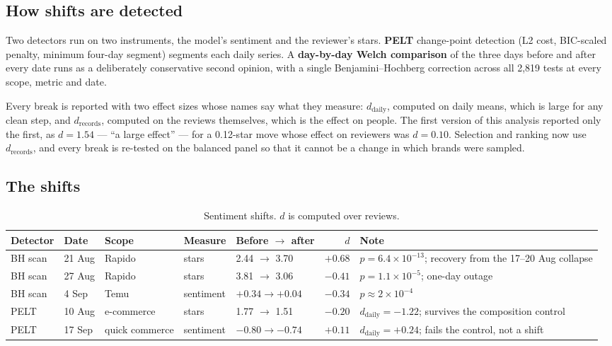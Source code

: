 \documentclass[11pt,a4paper]{article}
\begin{document}
\subsection{How shifts are detected}

Two detectors run on two instruments, the model's sentiment and the reviewer's stars. \textbf{PELT} change-point detection (L2 cost, BIC-scaled penalty, minimum four-day segment) segments each daily series. A \textbf{day-by-day Welch comparison} of the three days before and after every date runs as a deliberately conservative second opinion, with a single Benjamini--Hochberg correction across all 2,819 tests at every scope, metric and date.

Every break is reported with two effect sizes whose names say what they measure: $d_{\text{daily}}$, computed on daily means, which is large for any clean step, and $d_{\text{records}}$, computed on the reviews themselves, which is the effect on people. The first version of this analysis reported only the first, as $d=1.54$ --- ``a large effect'' --- for a 0.12-star move whose effect on reviewers was $d=0.10$. Selection and ranking now use $d_{\text{records}}$, and every break is re-tested on the balanced panel so that it cannot be a change in which brands were sampled.

\subsection{The shifts}\label{sec:shifts}

\begin{table}[htbp]\centering\small
\caption{Sentiment shifts. $d$ is computed over reviews.}\label{tab:shifts}
\begin{tabularx}{\linewidth}{@{}l l l l l r X@{}}
\toprule
Detector & Date & Scope & Measure & Before $\to$ after & $d$ & Note\\
\midrule
BH scan & 21 Aug & Rapido & stars & 2.44 $\to$ 3.70 & $+0.68$ & $p=6.4\times10^{-13}$; recovery from the 17--20 Aug collapse\\
BH scan & 27 Aug & Rapido & stars & 3.81 $\to$ 3.06 & $-0.41$ & $p=1.1\times10^{-5}$; one-day outage\\
BH scan & 4 Sep & Temu & sentiment & $+0.34\to+0.04$ & $-0.34$ & $p\approx2\times10^{-4}$\\
PELT & 10 Aug & e-commerce & stars & 1.77 $\to$ 1.51 & $-0.20$ & $d_{\text{daily}}=-1.22$; survives the composition control\\
PELT & 17 Sep & quick commerce & sentiment & $-0.80\to-0.74$ & $+0.11$ & $d_{\text{daily}}=+0.24$; fails the control, not a shift\\
\bottomrule
\end{tabularx}
\end{table}
\end{document}
